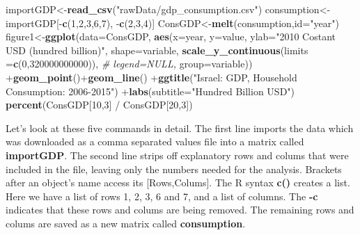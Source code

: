 \documentclass[12pt,a4paper,]{article}
\newenvironment{Shaded}{\begin{snugshade}}{\end{snugshade}}
\newcommand{\KeywordTok}[1]{\textcolor[rgb]{0.13,0.29,0.53}{\textbf{{#1}}}}
\newcommand{\DataTypeTok}[1]{\textcolor[rgb]{0.13,0.29,0.53}{{#1}}}
\newcommand{\DecValTok}[1]{\textcolor[rgb]{0.00,0.00,0.81}{{#1}}}
\newcommand{\StringTok}[1]{\textcolor[rgb]{0.31,0.60,0.02}{{#1}}}
\newcommand{\CommentTok}[1]{\textcolor[rgb]{0.56,0.35,0.01}{\textit{{#1}}}}
\newcommand{\NormalTok}[1]{{#1}}
\begin{document}
\begin{Shaded}
\begin{Highlighting}[]
\NormalTok{importGDP<-}\KeywordTok{read_csv}\NormalTok{(}\StringTok{"rawData/gdp_consumption.csv"}\NormalTok{)}
\NormalTok{consumption<-importGDP[-}\KeywordTok{c}\NormalTok{(}\DecValTok{1}\NormalTok{,}\DecValTok{2}\NormalTok{,}\DecValTok{3}\NormalTok{,}\DecValTok{6}\NormalTok{,}\DecValTok{7}\NormalTok{), -}\KeywordTok{c}\NormalTok{(}\DecValTok{2}\NormalTok{,}\DecValTok{3}\NormalTok{,}\DecValTok{4}\NormalTok{)]}
\NormalTok{ConsGDP<-}\KeywordTok{melt}\NormalTok{(consumption,}\DataTypeTok{id=}\StringTok{"year"}\NormalTok{)}
\NormalTok{figure1<-}\KeywordTok{ggplot}\NormalTok{(}\DataTypeTok{data=}\NormalTok{ConsGDP,}
           \KeywordTok{aes}\NormalTok{(}\DataTypeTok{x=}\NormalTok{year,}
               \DataTypeTok{y=}\NormalTok{value,}
               \DataTypeTok{ylab=}\StringTok{"2010 Costant USD (hundred billion)"}\NormalTok{,     }\DataTypeTok{shape=}\NormalTok{variable,}
               \KeywordTok{scale_y_continuous}\NormalTok{(}\DataTypeTok{limits =}\KeywordTok{c}\NormalTok{(}\DecValTok{0}\NormalTok{,}\DecValTok{320000000000}\NormalTok{)),}
              \CommentTok{# legend=NULL,}
               \DataTypeTok{group=}\NormalTok{variable))}
           \NormalTok{+}\KeywordTok{geom_point}\NormalTok{()+}\KeywordTok{geom_line}\NormalTok{()}
           \NormalTok{+}\KeywordTok{ggtitle}\NormalTok{(}\StringTok{"Israel: GDP,}
\StringTok{            Household Consumption: 2006-2015"}\NormalTok{)}
           \NormalTok{+}\KeywordTok{labs}\NormalTok{(}\DataTypeTok{subtitle=}\StringTok{"Hundred Billion USD"}\NormalTok{)}
\KeywordTok{percent}\NormalTok{(ConsGDP[}\DecValTok{10}\NormalTok{,}\DecValTok{3}\NormalTok{] /}\StringTok{ }\NormalTok{ConsGDP[}\DecValTok{20}\NormalTok{,}\DecValTok{3}\NormalTok{])}
\end{Highlighting}
\end{Shaded}

Let's look at these five commands in detail. The first line imports the
data which was downloaded as a comma separated values file into a matrix
called \textbf{importGDP}. The second line strips off explanatory rows
and colums that were included in the file, leaving only the numbers
needed for the analysis. Brackets after an object's name access its
{[}Rows,Colums{]}. The R syntax \textbf{c()} creates a list. Here we
have a list of rows 1, 2, 3, 6 and 7, and a list of columns. The
\textbf{-c} indicates that these rows and colums are being removed. The
remaining rows and colums are saved as a new matrix called
\textbf{consumption}.
\end{document}

